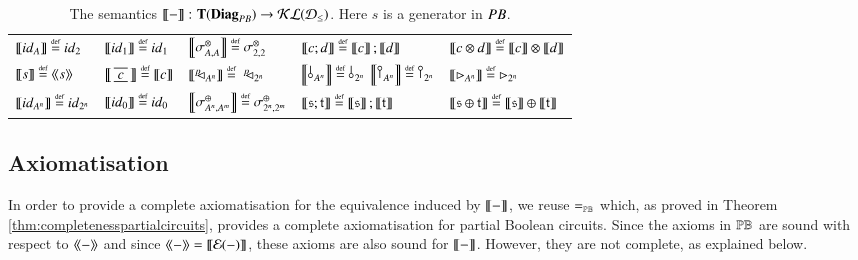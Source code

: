 \begin{table}[t]
    \renewcommand{\arraystretch}{1.5}
\!\!\!\begin{tabular}{l@{\;\;\;\;}l@{\;\;\;\;}l@{\;\;\;\;}l@{\;\;\;\;}l}
$\CBdsem{\id{A}} \defeq \id{2} $&$ \CBdsem{\id{1}} \defeq \id{1} $&$ \CBdsem{\symmt{A}{A}}  \defeq \symmt{2}{2}  $&$ \CBdsem{c;d}  \defeq \CBdsem{c} ; \CBdsem{d}   $ & $ \CBdsem{c\per d}  \defeq \CBdsem{c}  \per \CBdsem{d} $\\
$\CBdsem{s}  \defeq \osem{s} $& $\CBdsem{\, \tapeFunct{c} \,} \defeq \CBdsem{c}  $ & $\CBdsem{\diagp{A^n}}  \defeq \; \diagp{2^n}$& $\CBdsem{\bang{A^n}} \defeq \bang{2^n}$  \; $\CBdsem{\cobang{A^n}}  \defeq \cobang{2^n}$    & $\CBdsem{\codiag{A^n}} \defeq \codiag{2^n} $ \\
$\CBdsem{\id{A^n}} \defeq \id{2^n} $&$ \CBdsem{\id{\zero}}  \defeq \id{\zero}  $&$ \CBdsem{\symmp{A^n}{A^m}} \defeq \symmp{2^n}{2^m} $&$ \CBdsem{\s;\t}  \defeq \CBdsem{\s}  ; \CBdsem{\t}  $&$ \CBdsem{\s \piu \t}  \defeq \CBdsem{\s}  \piu \CBdsem{\t}  $ %
\end{tabular}
\caption{The semantics $\dsem{-}\colon \CatT{\Diag{\SigPB}} \to \KlD$. Here $s$ is a generator in $\SigPB$.}\label{eq:SEMANTICA}
\end{table}

\medskip





\subsection{Axiomatisation}\label{ssec:probbooltapes:axiomatisation}
In order to provide a complete axiomatisation for the equivalence induced by $\dsem{-}$, we reuse $\eqPB$ which, as proved in Theorem \ref{thm:completenesspartialcircuits}, provides a complete axiomatisation for partial Boolean circuits. 
Since the axioms in $\ThPB$ are sound with respect to $\osem{-}$ and since $\osem{-}=\dsem{\encoding{-}}$, these axioms are also sound for $\dsem{-}$. However, they are not complete, as explained below.


